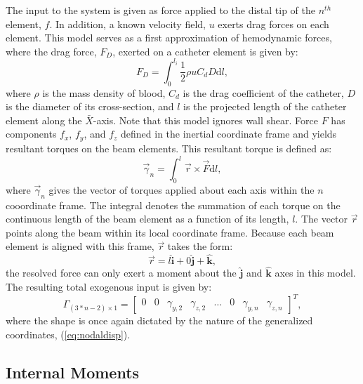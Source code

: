 \documentclass[letterpaper,10pt,conference]{ieeeconf}   %
\begin{document}
The input to the system is given as force applied to the distal tip of the $n^{th}$ element, $f$. In addition, a known velocity field, $u$ exerts drag forces on each element. This model serves as a first approximation of hemodynamic forces, where the drag force, $F_D$, exerted on a catheter element is given by:
%
\begin{equation}
\label{eq:drag_force}
F_D = \int_{0}^{l_i} \frac{1}{2}\rho u  C_d D \mathrm{d}l,
\end{equation}
%
where $\rho$ is the mass density of blood, $C_d$ is the drag coefficient of the catheter, $D$ is the diameter of its cross-section, and $l$ is the projected length of the catheter element along the $\bar{X}$-axis. Note that this model ignores wall shear. 
Force $F$ has components $f_x$, $f_y$, and $f_z$ defined in the inertial coordinate frame and yields resultant torques on the beam elements. This resultant torque is defined as:
%
\begin{equation}
\label{eq:forced_torque}
\vec{\gamma}_{n} = \int_{0}^{l}\vec{r} \times \vec{F} \mathrm{d}l,
\end{equation}
%
where $\vec{\gamma}_n$ gives the vector of torques applied about each axis within the $n$ cooordinate frame. The integral denotes the summation of each torque on the continuous length of the beam element as a function of its length, $l$. The vector $\vec{r}$ points along the beam within its local coordinate frame. Because each beam element is aligned with this frame, $\vec{r}$ takes the form:
%
\begin{equation}
\label{eq:r_vector}
\vec{r} = l \mathbf{\hat{i}} + 0 \mathbf{\hat{j}} + \mathbf{\hat{k}},
\end{equation}
%
the resolved force can only exert a moment about the $\mathbf{\hat{j}}$ and $\mathbf{\hat{k}}$ axes in this model. The resulting total exogenous input is given by:
%
\begin{equation}
\label{eq:Gamma}
\Gamma_{(3*n - 2) \times 1} = 
\begin{bmatrix}
 0 & 
 0 &
 \gamma_{y,2} & 
 \gamma_{z,2} &  
 \dots & 
 0 & 
 \gamma_{y,n} & 
 \gamma_{z,n}
\end{bmatrix}^T,
\end{equation}
%
where the shape is once again dictated by the nature of the generalized coordinates, (\ref{eq:nodaldisp}).

\subsection{Internal Moments}
\label{sec:internal_forces}
\end{document}
